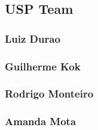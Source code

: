 \subsection{USP Team}

\subsubsection{Luiz Durao}

\subsubsection{Guilherme Kok}

\subsubsection{Rodrigo Monteiro}

\subsubsection{Amanda Mota}

